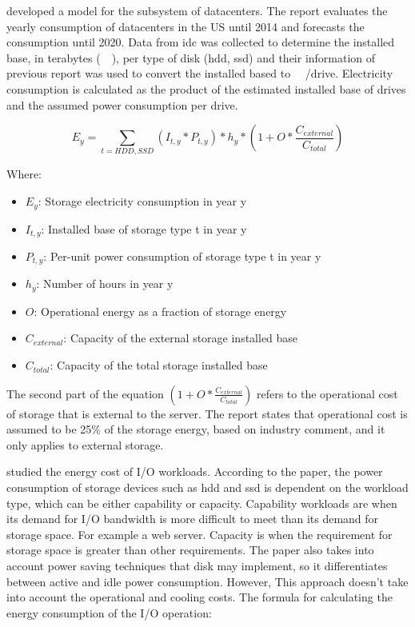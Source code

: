 
\citet{USReport2016} developed a model for the subsystem of datacenters. The report evaluates the yearly consumption of datacenters in the US until 2014 and forecasts the consumption until 2020. Data from \ac{idc} was collected to determine the installed base, in terabytes (\SI{}{\tera\byte}), per type of disk (\ac{hdd}, \ac{ssd}) and their information of previous report \citet{USReport2007} was used to convert the installed based to \SI{}{\tera\byte}/drive.
Electricity consumption is calculated as the product of the estimated installed base of drives and the assumed power consumption per drive.

\begin{equation}
\label{formula:usreport2016}
    E_y = \sum_{t=HDD,SSD}{(I_{t,y} * P_{t,y}) * h_y * (1 + O * \frac{C_{external}}{C_{total}})}
\end{equation}

Where:

\begin{itemize}
    \item $E_y$: Storage electricity consumption in year y
    \item $I_{t,y}$: Installed base of storage type t in year y
    \item $P_{t,y}$: Per-unit power consumption of storage type t in year y
    \item $h_y$: Number of hours in year y
    \item $O$: Operational energy as a fraction of storage energy
    \item $C_{external}$: Capacity of the external storage installed base
    \item $C_{total}$: Capacity of the total storage installed base
\end{itemize}

The second part of the equation $(1 + O * \frac{C_{external}}{C_{total}})$ refers to the operational cost of storage that is external to the server.
The report states that operational cost is assumed to be 25\% of the storage energy, based on industry comment, and it only applies to external storage.


\citet{Li2014} studied the energy cost of I/O workloads. According to the paper, the power consumption of storage devices such as \ac{hdd} and \ac{ssd} is dependent on the workload type, which can be either capability or capacity. Capability workloads are when its demand for I/O bandwidth is more difficult to meet than its demand for storage space. For example a web server. Capacity is when the requirement for storage space is greater than other requirements. The paper also takes into account power saving techniques that disk may implement, so it differentiates between active and idle power consumption. However, This approach doesn't take into account the operational and cooling costs.
The formula for calculating the energy consumption of the I/O operation:

